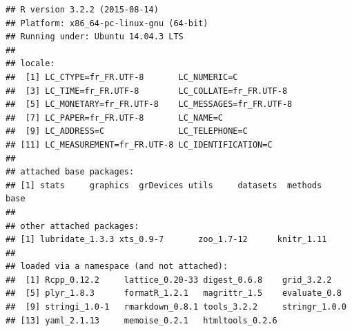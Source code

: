 \documentclass[]{article}
\begin{document}
\begin{verbatim}
## R version 3.2.2 (2015-08-14)
## Platform: x86_64-pc-linux-gnu (64-bit)
## Running under: Ubuntu 14.04.3 LTS
## 
## locale:
##  [1] LC_CTYPE=fr_FR.UTF-8       LC_NUMERIC=C              
##  [3] LC_TIME=fr_FR.UTF-8        LC_COLLATE=fr_FR.UTF-8    
##  [5] LC_MONETARY=fr_FR.UTF-8    LC_MESSAGES=fr_FR.UTF-8   
##  [7] LC_PAPER=fr_FR.UTF-8       LC_NAME=C                 
##  [9] LC_ADDRESS=C               LC_TELEPHONE=C            
## [11] LC_MEASUREMENT=fr_FR.UTF-8 LC_IDENTIFICATION=C       
## 
## attached base packages:
## [1] stats     graphics  grDevices utils     datasets  methods   base     
## 
## other attached packages:
## [1] lubridate_1.3.3 xts_0.9-7       zoo_1.7-12      knitr_1.11     
## 
## loaded via a namespace (and not attached):
##  [1] Rcpp_0.12.2     lattice_0.20-33 digest_0.6.8    grid_3.2.2     
##  [5] plyr_1.8.3      formatR_1.2.1   magrittr_1.5    evaluate_0.8   
##  [9] stringi_1.0-1   rmarkdown_0.8.1 tools_3.2.2     stringr_1.0.0  
## [13] yaml_2.1.13     memoise_0.2.1   htmltools_0.2.6
\end{verbatim}
\end{document}

